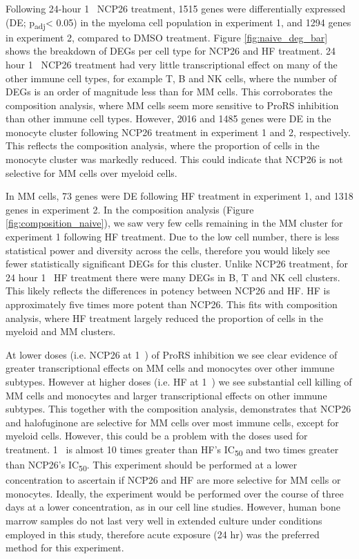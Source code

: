 Following 24-hour 1\si{\micro\Molar} NCP26 treatment, 1515 genes were differentially expressed (DE; p\textsubscript{adj}< 0.05) in the myeloma cell population in experiment 1, and 1294 genes in experiment 2, compared to DMSO treatment.
Figure \ref{fig:naive_deg_bar} shows the breakdown of DEGs per cell type for NCP26 and HF treatment.
24 hour 1\si{\micro\Molar} NCP26 treatment had very little transcriptional effect on many of the other immune cell types, for example T, B and NK cells, where the number of DEGs is an order of magnitude less than for MM cells.
This corroborates the composition analysis, where MM cells seem more sensitive to ProRS inhibition than other immune cell types.
However, 2016 and 1485 genes were DE in the monocyte cluster following NCP26 treatment in experiment 1 and 2, respectively.
This reflects the composition analysis, where the proportion of cells in the monocyte cluster was markedly reduced.
This could indicate that NCP26 is not selective for MM cells over myeloid cells.

In MM cells, 73 genes were DE following HF treatment in experiment 1, and 1318 genes in experiment 2.
In the composition analysis (Figure \ref{fig:composition_naive}), we saw very few cells remaining in the MM cluster for experiment 1 following HF treatment.
Due to the low cell number, there is less statistical power and diversity across the cells, therefore you would likely see fewer statistically significant DEGs for this cluster.
Unlike NCP26 treatment, for 24 hour 1\si{\micro\Molar} HF treatment there were many DEGs in B, T and NK cell clusters.
This likely reflects the differences in potency between NCP26 and HF\@.
HF is approximately five times more potent than NCP26.
This fits with composition analysis, where HF treatment largely reduced the proportion of cells in the myeloid and MM clusters.

At lower doses (i.e. NCP26 at 1\si{\micro\Molar}) of ProRS inhibition we see clear evidence of greater transcriptional effects on MM cells and monocytes over other immune subtypes.
However at higher doses (i.e. HF at 1\si{\micro\Molar}) we see substantial cell killing of MM cells and monocytes and larger transcriptional effects on other immune subtypes.
This together with the composition analysis, demonstrates that NCP26 and halofuginone are selective for MM cells over most immune cells, except for myeloid cells.
However, this could be a problem with the doses used for treatment.
1\si{\micro\Molar} is almost 10 times greater than HF's IC\textsubscript{50} and two times greater than NCP26's IC\textsubscript{50}.
This experiment should be performed at a lower concentration to ascertain if NCP26 and HF are more selective for MM cells or monocytes.
Ideally, the experiment would be performed over the course of three days at a lower concentration, as in our cell line studies.
However, human bone marrow samples do not last very well in extended culture under conditions employed in this study, therefore acute exposure (24 hr) was the preferred method for this experiment.

